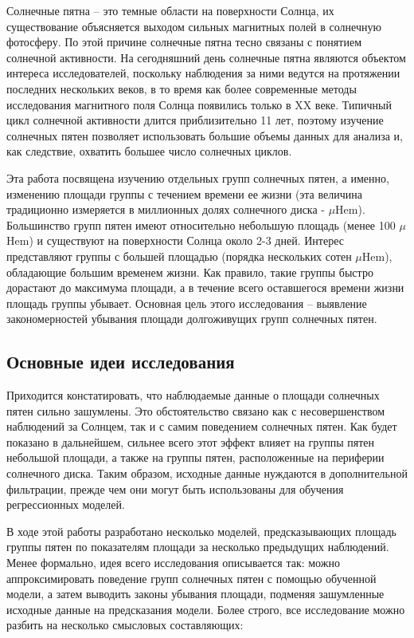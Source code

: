 \documentclass[a4paper, 12pt]{article}
\begin{document}
Солнечные пятна – это темные области на поверхности Солнца, их существование объясняется выходом сильных магнитных полей в солнечную фотосферу. По этой причине солнечные пятна тесно связаны с понятием солнечной активности. На сегодняшний день солнечные пятна являются объектом интереса исследователей, поскольку наблюдения за ними ведутся на протяжении последних нескольких веков, в то время как более современные методы исследования магнитного поля Солнца появились только в XX веке. Типичный цикл солнечной активности длится приблизительно 11 лет, поэтому изучение солнечных пятен позволяет использовать большие объемы данных для анализа и, как следствие, охватить большее число солнечных циклов.

Эта работа посвящена изучению отдельных групп солнечных пятен, а именно, изменению площади группы с течением времени ее жизни (эта величина традиционно измеряется в миллионных долях солнечного диска - $\mu$Hem). Большинство групп пятен имеют относительно небольшую площадь (менее 100 $\mu$Hem) и существуют на поверхности Солнца около 2-3 дней. Интерес представляют группы с большей площадью (порядка нескольких сотен $\mu$Hem), обладающие большим временем жизни. Как правило, такие группы быстро дорастают до максимума площади, а в течение всего оставшегося времени жизни площадь группы убывает. Основная цель этого исследования – выявление закономерностей убывания площади долгоживущих групп солнечных пятен.

\subsection{Основные идеи исследования}

Приходится констатировать, что наблюдаемые данные о площади солнечных пятен сильно зашумлены. Это обстоятельство связано как с несовершенством наблюдений за Солнцем, так и с самим поведением солнечных пятен. Как будет показано в дальнейшем, сильнее всего этот эффект влияет на группы пятен небольшой площади, а также на группы пятен, расположенные на периферии солнечного диска. Таким образом, исходные данные нуждаются в дополнительной фильтрации, прежде чем они могут быть использованы для обучения регрессионных моделей.

В ходе этой работы разработано несколько моделей, предсказывающих площадь группы пятен по показателям площади за несколько предыдущих наблюдений. Менее формально, идея всего исследования описывается так: можно аппроксимировать поведение групп солнечных пятен с помощью обученной модели, а затем выводить законы убывания площади, подменяя зашумленные исходные данные на предсказания модели. Более строго, все исследование можно разбить на несколько смысловых составляющих:
\end{document}
